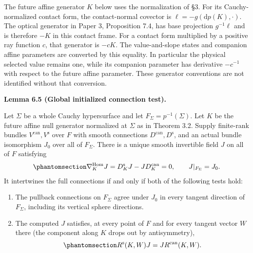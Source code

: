 \documentclass[
  english,
  11pt,
  reqno]{amsart}
\makeatletter
\newcommand{\pandocstatementheading}[1]{%
  \par\if@nobreak\else
    \addpenalty{\@beginparpenalty}%
    \addvspace{.5\baselineskip plus .2\baselineskip minus .2\baselineskip}%
  \fi
  {\normalfont\bfseries #1\par}%
  \nobreak\@afterindenttrue\@afterheading
}
\makeatother
\begin{document}
The future affine generator \(K\) below uses the normalization of §3.
For its Cauchy-normalized contact form, the contact-normal covector is
\(\ell=-g(\mathrm dp(K),\cdot)\). The optical generator in Paper 3,
Proposition 7.4, has base projection \(g^{-1}\ell\) and is therefore
\(-K\) in this contact frame. For a contact form multiplied by a
positive ray function \(c\), that generator is \(-cK\). The
value-and-slope states and companion affine parameters are converted by
this equality. In particular the physical selected value remains one,
while its companion parameter has derivative \(-c^{-1}\) with respect to
the future affine parameter. These generator conventions are not
identified without that conversion.

\pandocstatementheading{\protect{}\label{lem:global-initialized-finite-rank-normalization}Lemma 6.5 (Global initialized connection test).}

Let \(\Sigma\) be a whole Cauchy hypersurface and let
\(F_\Sigma=p^{-1}(\Sigma)\). Let \(K\) be the future affine null
generator normalized at \(\Sigma\) as in Theorem 3.2. Supply finite-rank
bundles \(V^{\mathrm{can}},V^{\mathrm{s}}\) over \(F\) with smooth
connections \(D^{\mathrm{can}},D^{\mathrm{s}}\), and an actual bundle
isomorphism \(J_0\) over all of \(F_\Sigma\). There is a unique smooth
invertible field \(J\) on all of \(F\) satisfying
\begin{equation}\protect\phantomsection\label{eq:global-initialized-finite-rank-transport}{
\nabla^{\operatorname{Hom}}_KJ
=D^{\mathrm{s}}_KJ-JD^{\mathrm{can}}_K=0,
\qquad J|_{F_\Sigma}=J_0.
}\end{equation} It intertwines the full connections if and only if both
of the following tests hold:

\begin{enumerate}
\item
  The pullback connections on \(F_\Sigma\) agree under \(J_0\) in every
  tangent direction of \(F_\Sigma\), including its vertical sphere
  directions.
\item
  The computed \(J\) satisfies, at every point of \(F\) and for every
  tangent vector \(W\) there (the component along \(K\) drops out by
  antisymmetry),
  \begin{equation}\protect\phantomsection\label{eq:global-finite-rank-curvature-test}{
  R^{\mathrm{s}}(K,W)J=JR^{\mathrm{can}}(K,W).
  }\end{equation}
\end{enumerate}
\end{document}
